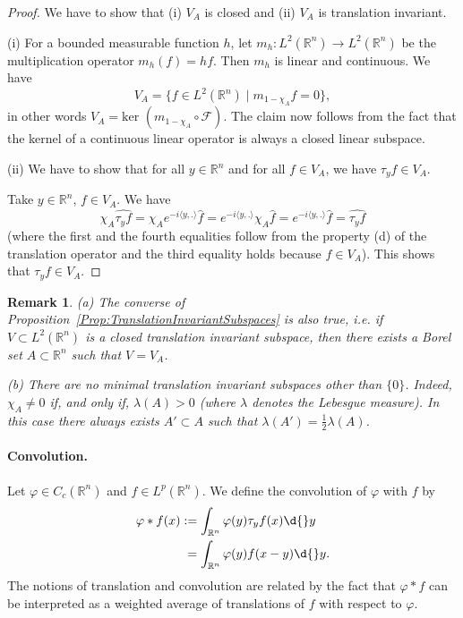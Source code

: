 \documentclass[12pt, oneside, a4paper]{article}
\theoremstyle{dfn}
\newtheorem{rem}[thm]{Remark}
\def \ker {\text{ker }}
\newcommand{\scalprod}[2]{\langle #1,#2 \rangle}
\def\Rbb{\ensuremath{\mathbb{R}}}
\newcommand{\Fcal}{\mathcal{F}}
\begin{document}
\begin{proof}
We have to show that (i) $V_A$ is closed and (ii) $V_A$ is translation invariant.

(i) For a bounded measurable function $h$, let $m_h \colon L^2(\Rbb^n) \to L^2(\Rbb^n)$ be the multiplication operator $m_h(f) = hf$. Then $m_h$ is linear and continuous. We have
\[
V_A = \{ f \in L^2(\Rbb^n) \mid m_{1-\chi_A}\widehat{f} = 0 \},
\]
in other words $V_A = \ker(m_{1-\chi_A} \circ \Fcal)$. The claim now follows from the fact that the kernel of a continuous linear operator is always a closed linear subspace.

(ii) We have to show that for all $y \in \Rbb^n$ and for all $f \in V_A$, we have $\tau_y f \in V_A$.

Take $y \in \Rbb^n$, $f \in V_A$. We have
\[
\chi_A \widehat{\tau_y f}
	=%
\chi_A e^{-i\scalprod{y}{.}} \widehat{f}
	=
e^{-i\scalprod{y}{.}} \chi_A \widehat{f}
	=%
e^{-i\scalprod{y}{.}} \widehat{f}
	=%
\widehat{\tau_y f}
\]
(where the first and the fourth equalities follow from the property (d) of the translation operator and the third equality holds because $f \in V_A$). This shows that $\tau_y f \in V_A$.
\end{proof}

\begin{rem}
(a) The converse of Proposition~\ref{Prop:TranslationInvariantSubspaces} is also true, i.e. if $V \subset L^2(\Rbb^n)$ is a closed translation invariant subspace, then there exists a Borel set $A \subset \Rbb^n$ such that $V = V_A$.

(b) There are no minimal translation invariant subspaces other than $\{0\}$. Indeed, $\chi_A \neq 0$ if, and only if, $\lambda(A) > 0$ (where $\lambda$ denotes the Lebesgue measure). In this case there always exists $A' \subset A$ such that $\lambda(A') = \frac{1}{2} \lambda(A)$.
\end{rem}

\paragraph{Convolution.} Let $\varphi \in C_c(\Rbb^n)$ and $f \in L^p(\Rbb^n)$. We define the convolution of $\varphi$ with $f$ by
\begin{align*}
	\varphi * f(x)
	&:= \int_{\Rbb^n} \varphi(y) \tau_y f(x) \d{}y \\
	&\phantom{:}= \int_{\Rbb^n} \varphi(y) f(x-y) \d{}y.
\end{align*}
The notions of translation and convolution are related by the fact that $\varphi * f$ can be interpreted as a weighted average of translations of $f$ with respect to $\varphi$.
\end{document}
